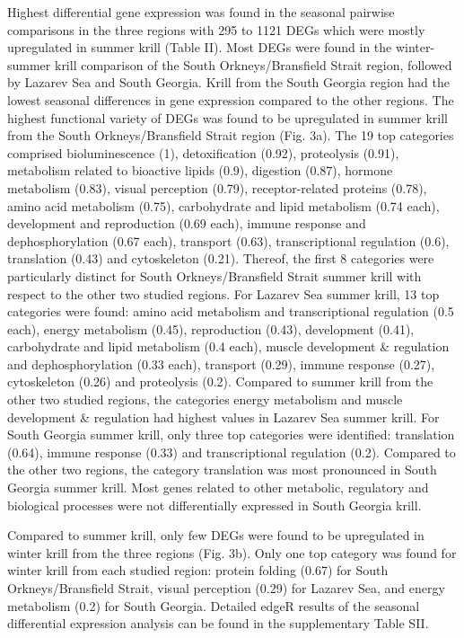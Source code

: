 Highest differential gene expression was found in the seasonal pairwise comparisons in the three regions with 295 to 1121 DEGs which were mostly upregulated in summer krill (Table II). Most DEGs were found in the winter-summer krill comparison of the South Orkneys/Bransfield Strait region, followed by Lazarev Sea and South Georgia. Krill from the South Georgia region had the lowest seasonal differences in gene expression compared to the other regions.
The highest functional variety of DEGs was found to be upregulated in summer krill from the South Orkneys/Bransfield Strait region (Fig. 3a). The 19 top categories comprised bioluminescence (1), detoxification (0.92), proteolysis (0.91), metabolism related to bioactive lipids (0.9), digestion (0.87), hormone metabolism (0.83), visual perception (0.79),  receptor-related proteins (0.78), amino acid metabolism (0.75), carbohydrate and lipid metabolism (0.74 each), development and reproduction (0.69 each), immune response and dephosphorylation (0.67 each), transport (0.63), transcriptional regulation (0.6), translation (0.43) and cytoskeleton (0.21). Thereof, the first 8 categories were particularly distinct for South Orkneys/Bransfield Strait summer krill with respect to the other two studied regions.
For Lazarev Sea summer krill, 13 top categories were found: amino acid metabolism and transcriptional regulation (0.5 each), energy metabolism (0.45), reproduction (0.43), development (0.41), carbohydrate and lipid metabolism (0.4 each), muscle development & regulation and dephosphorylation (0.33 each), transport (0.29), immune response (0.27), cytoskeleton (0.26) and proteolysis (0.2). Compared to summer krill from the other two studied  regions, the categories energy metabolism and muscle development & regulation had highest values in Lazarev Sea summer krill. 
For South Georgia summer krill, only three top categories were identified: translation (0.64), immune response (0.33) and transcriptional regulation (0.2). Compared to the other two regions, the category translation was most pronounced in South Georgia summer krill. Most genes related to other metabolic, regulatory and biological processes were not differentially expressed in South Georgia krill.

Compared to summer krill, only few DEGs were found to be upregulated in winter krill from the three regions (Fig. 3b).  Only one top category was found for winter krill from each studied region: protein folding (0.67) for South Orkneys/Bransfield Strait, visual perception (0.29) for Lazarev Sea, and energy metabolism (0.2) for South Georgia. 
Detailed edgeR results of the seasonal differential expression analysis can be found in the supplementary Table SII.

